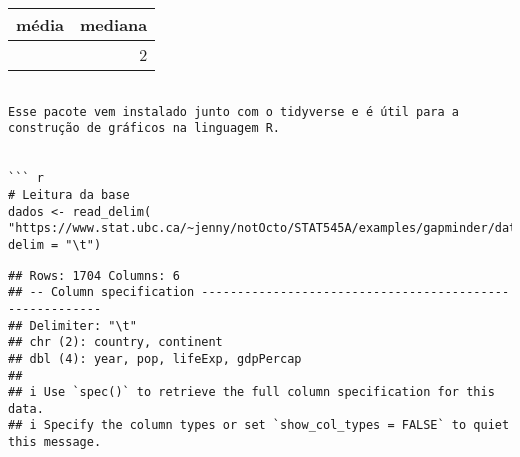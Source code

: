 \documentclass[
]{article}
\newenvironment{Shaded}{\begin{snugshade}}{\end{snugshade}}
\newcommand{\AttributeTok}[1]{\textcolor[rgb]{0.13,0.29,0.53}{#1}}
\newcommand{\DecValTok}[1]{\textcolor[rgb]{0.00,0.00,0.81}{#1}}
\newcommand{\FunctionTok}[1]{\textcolor[rgb]{0.13,0.29,0.53}{\textbf{#1}}}
\newcommand{\NormalTok}[1]{#1}
\newcommand{\OtherTok}[1]{\textcolor[rgb]{0.56,0.35,0.01}{#1}}
\newcommand{\SpecialCharTok}[1]{\textcolor[rgb]{0.81,0.36,0.00}{\textbf{#1}}}
\newcommand{\StringTok}[1]{\textcolor[rgb]{0.31,0.60,0.02}{#1}}
\begin{document}
\begin{Shaded}
\end{Shaded}

\begin{longtable}[]{@{}rr@{}}
\toprule\noalign{}
média & mediana \\
\midrule\noalign{}
\endhead
\bottomrule\noalign{}
\endlastfoot
2.22 & 2 \\
\end{longtable}

\begin{verbatim}

Esse pacote vem instalado junto com o tidyverse e é útil para a construção de gráficos na linguagem R.


``` r
# Leitura da base
dados <- read_delim( "https://www.stat.ubc.ca/~jenny/notOcto/STAT545A/examples/gapminder/data/gapminderDataFiveYear.txt", delim = "\t")
\end{verbatim}

\begin{verbatim}
## Rows: 1704 Columns: 6
## -- Column specification --------------------------------------------------------
## Delimiter: "\t"
## chr (2): country, continent
## dbl (4): year, pop, lifeExp, gdpPercap
## 
## i Use `spec()` to retrieve the full column specification for this data.
## i Specify the column types or set `show_col_types = FALSE` to quiet this message.
\end{verbatim}
\end{document}
